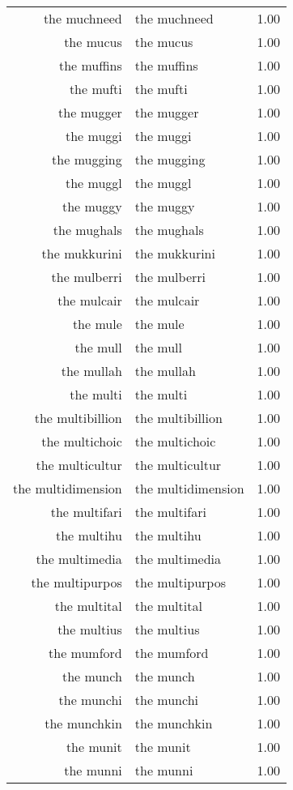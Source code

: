 \begin{table}[ht]
\begin{tabular}{rlr}
  the muchneed & the muchneed & 1.00 \\ 
  the mucus & the mucus & 1.00 \\ 
  the muffins & the muffins & 1.00 \\ 
  the mufti & the mufti & 1.00 \\ 
  the mugger & the mugger & 1.00 \\ 
  the muggi & the muggi & 1.00 \\ 
  the mugging & the mugging & 1.00 \\ 
  the muggl & the muggl & 1.00 \\ 
  the muggy & the muggy & 1.00 \\ 
  the mughals & the mughals & 1.00 \\ 
  the mukkurini & the mukkurini & 1.00 \\ 
  the mulberri & the mulberri & 1.00 \\ 
  the mulcair & the mulcair & 1.00 \\ 
  the mule & the mule & 1.00 \\ 
  the mull & the mull & 1.00 \\ 
  the mullah & the mullah & 1.00 \\ 
  the multi & the multi & 1.00 \\ 
  the multibillion & the multibillion & 1.00 \\ 
  the multichoic & the multichoic & 1.00 \\ 
  the multicultur & the multicultur & 1.00 \\ 
  the multidimension & the multidimension & 1.00 \\ 
  the multifari & the multifari & 1.00 \\ 
  the multihu & the multihu & 1.00 \\ 
  the multimedia & the multimedia & 1.00 \\ 
  the multipurpos & the multipurpos & 1.00 \\ 
  the multital & the multital & 1.00 \\ 
  the multius & the multius & 1.00 \\ 
  the mumford & the mumford & 1.00 \\ 
  the munch & the munch & 1.00 \\ 
  the munchi & the munchi & 1.00 \\ 
  the munchkin & the munchkin & 1.00 \\ 
  the munit & the munit & 1.00 \\ 
  the munni & the munni & 1.00 \\ 

\end{tabular}
\end{table}
